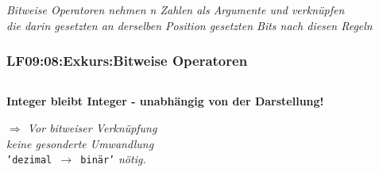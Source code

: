 \begin{frame}[fragile]
\begin{small}
\begin{center}
\begin{tabular}{c|c|c|c|}
\end{tabular}
    \end{center}
  \end{small}
  
  \vspace{0.5cm}
\begin{footnotesize}
    \begin{flushright}
      \textit{Bitweise Operatoren nehmen n Zahlen als Argumente und verknüpfen \\
      die darin gesetzten an derselben Position gesetzten Bits nach diesen Regeln}
    \end{flushright}
  \end{footnotesize}

\end{frame}

\begin{frame}[fragile]  
  \frametitle{LF09:08:Exkurs:Bitweise Operatoren}

    \begin{center}
    \begin{minipage}{0.9\textwidth}
  
      \inputminted[fontsize=\footnotesize,linenos]{python}{\snpLf/dm-0908-int-remains-int.py}
    \end{minipage}
    \end{center}


  \vspace{0.6cm}
  \begin{flushright}
    \begin{footnotesize}
      \textrm{\textbf{Integer bleibt Integer - unabhängig von der Darstellung!}}
      
      \vspace{0.3cm}
      \textrm{\textit{$\Rightarrow$ Vor bitweiser Verknüpfung}}\\
      \textrm{\textit{keine gesonderte Umwandlung}}\\
      \texttt{'dezimal $\rightarrow$ binär'} \textrm{\textit{nötig.}}\\
    \end{footnotesize}
  \end{flushright}
\end{frame}

